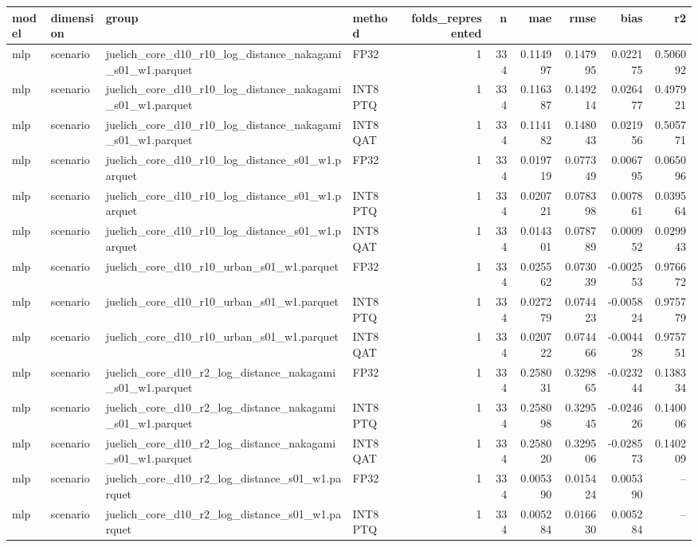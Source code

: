 \begin{tabular}{llllrrrrrr}
\toprule
model & dimension & group & method & folds\_represented & n & mae & rmse & bias & r2 \\
\midrule
mlp & scenario & juelich\_core\_d10\_r10\_log\_distance\_nakagami\_s01\_w1.parquet & FP32 & 1 & 334 & 0.114997 & 0.147995 & 0.022175 & 0.506092 \\
mlp & scenario & juelich\_core\_d10\_r10\_log\_distance\_nakagami\_s01\_w1.parquet & INT8 PTQ & 1 & 334 & 0.116387 & 0.149214 & 0.026477 & 0.497921 \\
mlp & scenario & juelich\_core\_d10\_r10\_log\_distance\_nakagami\_s01\_w1.parquet & INT8 QAT & 1 & 334 & 0.114182 & 0.148043 & 0.021956 & 0.505771 \\
mlp & scenario & juelich\_core\_d10\_r10\_log\_distance\_s01\_w1.parquet & FP32 & 1 & 334 & 0.019719 & 0.077349 & 0.006795 & 0.065096 \\
mlp & scenario & juelich\_core\_d10\_r10\_log\_distance\_s01\_w1.parquet & INT8 PTQ & 1 & 334 & 0.020721 & 0.078398 & 0.007861 & 0.039564 \\
mlp & scenario & juelich\_core\_d10\_r10\_log\_distance\_s01\_w1.parquet & INT8 QAT & 1 & 334 & 0.014301 & 0.078789 & 0.000952 & 0.029943 \\
mlp & scenario & juelich\_core\_d10\_r10\_urban\_s01\_w1.parquet & FP32 & 1 & 334 & 0.025562 & 0.073039 & -0.002553 & 0.976672 \\
mlp & scenario & juelich\_core\_d10\_r10\_urban\_s01\_w1.parquet & INT8 PTQ & 1 & 334 & 0.027279 & 0.074423 & -0.005824 & 0.975779 \\
mlp & scenario & juelich\_core\_d10\_r10\_urban\_s01\_w1.parquet & INT8 QAT & 1 & 334 & 0.020722 & 0.074466 & -0.004428 & 0.975751 \\
mlp & scenario & juelich\_core\_d10\_r2\_log\_distance\_nakagami\_s01\_w1.parquet & FP32 & 1 & 334 & 0.258031 & 0.329865 & -0.023244 & 0.138334 \\
mlp & scenario & juelich\_core\_d10\_r2\_log\_distance\_nakagami\_s01\_w1.parquet & INT8 PTQ & 1 & 334 & 0.258098 & 0.329545 & -0.024626 & 0.140006 \\
mlp & scenario & juelich\_core\_d10\_r2\_log\_distance\_nakagami\_s01\_w1.parquet & INT8 QAT & 1 & 334 & 0.258020 & 0.329506 & -0.028573 & 0.140209 \\
mlp & scenario & juelich\_core\_d10\_r2\_log\_distance\_s01\_w1.parquet & FP32 & 1 & 334 & 0.005390 & 0.015424 & 0.005390 & -- \\
mlp & scenario & juelich\_core\_d10\_r2\_log\_distance\_s01\_w1.parquet & INT8 PTQ & 1 & 334 & 0.005284 & 0.016630 & 0.005284 & -- \\

\end{tabular}

